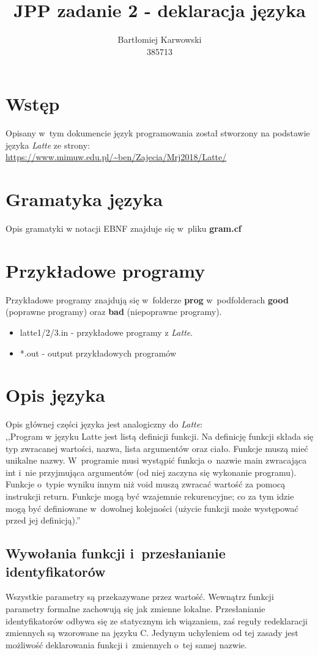 \documentclass{article}
\title{JPP zadanie 2 - deklaracja języka}
\author{Bartłomiej Karwowski\\385713}
\date{}
\begin{document}
\maketitle

\section{Wstęp}
Opisany w~tym dokumencie język programowania został stworzony 
na podstawie języka \textit{Latte} ze strony:\\

\url{https://www.mimuw.edu.pl/~ben/Zajecia/Mrj2018/Latte/}

\section{Gramatyka języka}
Opis gramatyki w notacji EBNF znajduje się w~pliku \textbf{gram.cf}

\section{Przykładowe programy}
Przykładowe programy znajdują się w~folderze \textbf{prog} w~podfolderach 
\textbf{good} (poprawne programy) oraz \textbf{bad} (niepoprawne programy).
\begin{itemize}
    \item latte1/2/3.in - przykładowe programy z \textit{Latte}.
    \item *.out - output przykładowych programów
\end{itemize}

\newpage
\section{Opis języka}
Opis głównej części języka jest analogiczny do \textit{Latte}: \\
,,Program w języku Latte jest listą definicji funkcji. 
Na definicję funkcji składa się typ zwracanej wartości, nazwa, lista argumentów oraz ciało. 
Funkcje muszą mieć unikalne nazwy. 
W~programie musi wystąpić funkcja o~nazwie main zwracająca int 
i~nie przyjmująca argumentów (od niej zaczyna się wykonanie programu).
Funkcje o~typie wyniku innym niż void muszą zwracać wartość za pomocą instrukcji return. Funkcje mogą być wzajemnie rekurencyjne; co za tym idzie mogą być definiowane w~dowolnej kolejności (użycie funkcji może występować przed jej definicją).''

\subsection{Wywołania funkcji i~przesłanianie identyfikatorów}
Wszystkie parametry są przekazywane przez wartość. 
Wewnątrz funkcji parametry formalne zachowują się jak zmienne lokalne.
Przesłanianie identyfikatorów odbywa się ze statycznym ich wiązaniem,
zaś reguły redeklaracji zmiennych są wzorowane na języku C.
Jedynym uchyleniem od tej zasady jest możliwość deklarowania funkcji i~zmiennych o~tej samej nazwie.
\end{document}
